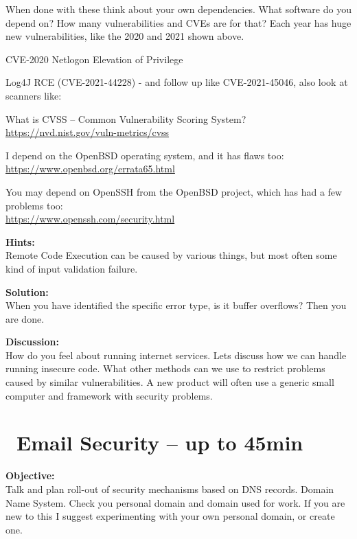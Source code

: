\documentclass[a4paper,11pt,notitlepage]{report}
\begin{document}
When done with these think about your own dependencies. What software do you depend on? How many vulnerabilities and CVEs are for that? Each year has huge new vulnerabilities, like the 2020 and 2021 shown above.

\begin{list2}
\item CVE-2020 Netlogon Elevation of Privilege \\
\item Log4J RCE (CVE-2021-44228) - and follow up like CVE-2021-45046, also look at scanners like:\\
\end{list2}

What is CVSS -- Common Vulnerability Scoring System?\\
\url{https://nvd.nist.gov/vuln-metrics/cvss}

I depend on the OpenBSD operating system, and it has flaws too:\\
\url{https://www.openbsd.org/errata65.html}

You may depend on OpenSSH from the OpenBSD project, which has had a few problems too:\\
\url{https://www.openssh.com/security.html}

{\bf Hints:}\\
Remote Code Execution can be caused by various things, but most often some kind of input validation failure.

{\bf Solution:}\\
When you have identified the specific error type, is it buffer overflows? Then you are done.

{\bf Discussion:}\\
How do you feel about running internet services. Lets discuss how we can handle running insecure code.
What other methods can we use to restrict problems caused by similar vulnerabilities.
A new product will often use a generic small computer and framework with security problems.


\chapter{\faExclamationTriangle\ Email Security -- up to 45min}
\label{ex:email-security}

{\bf Objective:}\\
Talk and plan roll-out of security mechanisms based on DNS records. Domain Name System. Check you personal domain and domain used for work. If you are new to this I suggest experimenting with your own personal domain, or create one.
\end{document}
